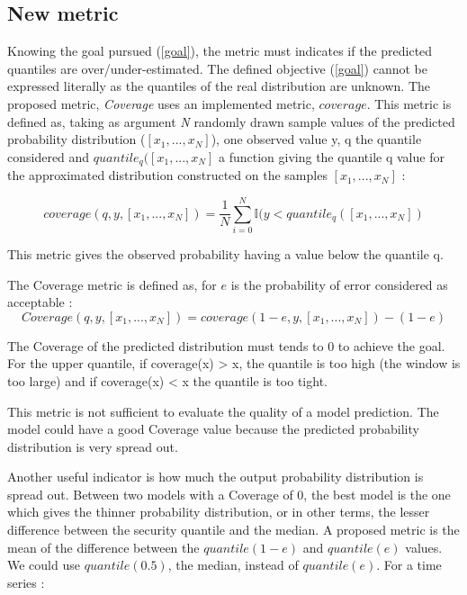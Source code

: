 \subsection{New metric}\label{other_metrics}

Knowing the goal pursued (\ref{goal}), the metric must indicates if the predicted quantiles are over/under-estimated. 
The defined objective (\ref{goal}) cannot be expressed literally as the quantiles of the real distribution are unknown.
The proposed 
metric, \textit{Coverage} uses an implemented metric, $coverage$.
This metric is defined as, taking as argument \textit{N} randomly drawn sample values of the predicted probability distribution ($[{x_1},...,{x_N}]$), one observed value y,
q the quantile considered and $quantile_q([{x_1},...,{x_N}]$ a function giving the quantile q value for the approximated distribution constructed on the samples $[{x_1},...,{x_N}]$ :

\begin{equation}
    coverage(q,y,[{x_1},...,{x_N}]) = \frac{1}{N}\sum_{i=0}^{N} \mathbb{I}(y<quantile_q([{x_1},...,{x_N}])
\end{equation}


This metric gives the observed probability having a value below the quantile q.

The Coverage metric is defined as, for $e$ is the probability of error considered as acceptable  :  
\begin{equation}
    Coverage(q,y,[{x_1},...,{x_N}]) = coverage(1 - e,y,[{x_1},...,{x_N}]) - (1 - e)
\end{equation}

The Coverage of the predicted distribution must tends to 0 to achieve the goal. For the upper quantile,
if coverage(x) > x, the quantile is too high (the window is too large) and
if coverage(x) < x the quantile is too tight.

This metric is not sufficient to evaluate the quality of a model prediction. The model could have a good Coverage value because the predicted probability distribution is very spread out. 

Another useful indicator is how much the output probability distribution is spread out. 
Between two models with a Coverage of 0, the best model is the one which gives the thinner probability distribution, or in other terms, the lesser difference between the security quantile and the median.
A proposed metric is  the mean of the difference between 
the $quantile(1-e)$ and $quantile(e)$ values. We could use $quantile(0.5)$, the median, instead of $quantile(e)$. For a time series :

